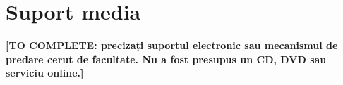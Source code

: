 \chapter*{Suport media}

\textbf{[TO COMPLETE: precizați suportul electronic sau mecanismul de predare cerut de facultate. Nu a fost presupus un CD, DVD sau serviciu online.]}
